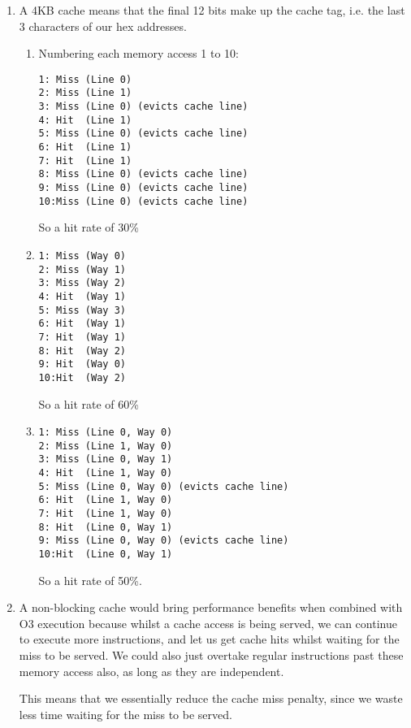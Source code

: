 


\begin{enumerate}[label=(\alph*)]
  \item
    A 4KB cache means that the final 12 bits make up the cache tag, i.e. the last 3 characters of our hex addresses.

    \begin{enumerate}[label=(\roman*)]
      \item
        Numbering each memory access 1 to 10:

\begin{verbatim}
1: Miss (Line 0)
2: Miss (Line 1)
3: Miss (Line 0) (evicts cache line)
4: Hit  (Line 1)
5: Miss (Line 0) (evicts cache line)
6: Hit  (Line 1)
7: Hit  (Line 1)
8: Miss (Line 0) (evicts cache line)
9: Miss (Line 0) (evicts cache line)
10:Miss (Line 0) (evicts cache line)
\end{verbatim}

So a hit rate of 30\%

\item
\begin{verbatim}
1: Miss (Way 0)
2: Miss (Way 1)
3: Miss (Way 2)
4: Hit  (Way 1)
5: Miss (Way 3)
6: Hit  (Way 1)
7: Hit  (Way 1)
8: Hit  (Way 2)
9: Hit  (Way 0)
10:Hit  (Way 2)
\end{verbatim}

So a hit rate of 60\%

\item
\begin{verbatim}
1: Miss (Line 0, Way 0)
2: Miss (Line 1, Way 0)
3: Miss (Line 0, Way 1)
4: Hit  (Line 1, Way 0)
5: Miss (Line 0, Way 0) (evicts cache line)
6: Hit  (Line 1, Way 0)
7: Hit  (Line 1, Way 0)
8: Hit  (Line 0, Way 1)
9: Miss (Line 0, Way 0) (evicts cache line)
10:Hit  (Line 0, Way 1)
\end{verbatim}

So a hit rate of 50\%.
    \end{enumerate}

  \item

    A non-blocking cache  would bring performance benefits when combined with O3 execution because whilst a cache access is being served, we can continue to execute more instructions, and let us get cache hits whilst waiting for the miss to be served. We could also just overtake regular instructions past these memory access also, as long as they are independent.

    This means that we essentially reduce the cache miss penalty, since we waste less time waiting for the miss to be served.


\end{enumerate}
